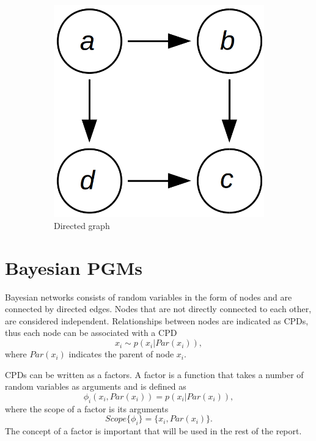 \documentclass[12pt,oneside,openany,a4paper, %
afrikaans,english,
]{memoir}
\numberwithin{equation}{chapter}
\begin{document}
\begin{figure}[h!]
\begin{subfigure}[b]{0.25\linewidth}
    \includegraphics[width=\linewidth]{Figures/directed_graph.png}
    \caption{Directed graph}
  \end{subfigure}
  \caption{}
  \label{fig:comGraphs}
\end{figure}
\section{Bayesian PGMs}
Bayesian networks consists of random variables in the form of nodes and are connected by directed edges. Nodes that are not directly connected to each other, are considered independent. Relationships between nodes are indicated as CPDs, thus each node can be associated with a CPD
\begin{equation}
x_i \sim p(x_i|Par(x_i)),
\end{equation}
where $Par(x_i)$ indicates the parent of node $x_i$.

CPDs can be written as a factors. A factor is a function that takes a number of random variables as arguments and is defined as
\begin{equation}
\phi_i(x_i, Par(x_i)) = p(x_i|Par(x_i)),
\end{equation}
where the scope of a factor is its arguments 
\begin{equation}
Scope\{\phi_i\} = \{x_i, Par(x_i)\}.
\end{equation}
The concept of a factor is important that will be used in the rest of the report.
\end{document}

